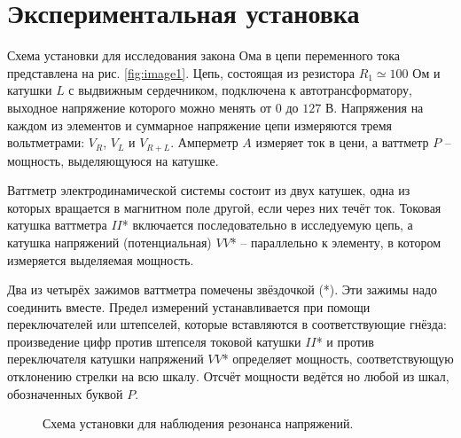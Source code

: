 \documentclass[a4paper,12pt]{article} %
\begin{document}
\section{Экспериментальная установка}
Схема установки для исследования закона Ома в цепи переменного тока представлена на рис. \ref{fig:image1}. Цепь, состоящая из резистора $ R_1 \simeq 100 $ Ом и катушки $ L $ с выдвижным сердечником, подключена к автотрансформатору, выходное напряжение которого можно менять от $ 0 $ до $ 127 $ В. Напряжения на каждом из элементов и суммарное напряжение цепи измеряются тремя вольтметрами: $ V_R $, $ V_L $ и $ V_{R+L} $. Амперметр $ A $ измеряет ток в цени, а ваттметр $ P $ -- мощность, выделяющуюся на катушке.

Ваттметр электродинамической системы состоит из двух катушек, одна из которых вращается в магнитном поле другой, если через них течёт ток. Токовая катушка ваттметра $ II $* включается последовательно в исследуемую цепь, а катушка напряжений (потенциальная) $ VV $* -- параллельно к элементу, в котором измеряется выделяемая мощность.

Два из четырёх зажимов ваттметра помечены звёздочкой (*). Эти зажимы надо соединить вместе. Предел измерений устанавливается при помощи переключателей или штепселей, которые вставляются в соответствующие гнёзда: произведение цифр против штепселя токовой катушки $ II $* и против переключателя катушки напряжений $ VV $* определяет мощность, соответствующую отклонению стрелки на всю шкалу. Отсчёт мощности ведётся но любой из шкал, обозначенных буквой $ P $.

\begin{figure}[h]
	\caption{\centering Схема установки для наблюдения резонанса напряжений.}
	\label{fig:image2}
\end{figure}
\end{document}
